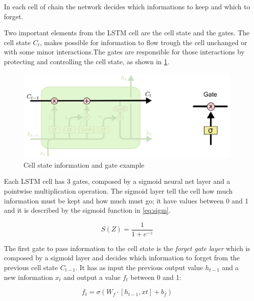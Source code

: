 \documentclass[12pt]{report}
\begin{document}
In each cell of chain the network decides which informations to keep and which to forget.

Two important elements from the LSTM cell are the cell state and the gates. The cell state $C_t$, makes possible for information to flow trough the cell unchanged or with some minor interactions.The gates are responsible for those interactions by protecting and controlling the cell state, as shown in \ref{fig:lstm2}.

\begin{figure}[!h]
\centering
\includegraphics[scale=0.4]{lstm2.pdf}
\caption{Cell state information and gate example}
\label{fig:lstm2}
\end{figure}

Each LSTM cell has 3 gates, composed by a sigmoid neural net layer and a pointwise multiplication operation. The sigmoid layer tell the cell how much information must be kept and how much must go; it have values between 0 and 1 and it is described by the sigmoid function in \ref{eq:sigm}.

\begin{equation}
S(Z) = \dfrac{1}{1+ e^{-z}}
\label{eq:sigm}
\end{equation}

The first gate to pass information to the cell state is the \textit{forget gate layer} which is composed by a sigmoid layer and decides which information to forget from the previous cell state $C_{t-1}$.
It has as input the previous output value $h_{t-1}$ and a new information $x_t$ and output a value $f_t$ between 0 and 1:

\begin{equation}
f_t = \sigma(W_f \cdot [h_{t-1}, xt] + b_f)
\label{eq:ft}
\end{equation}
\end{document}
